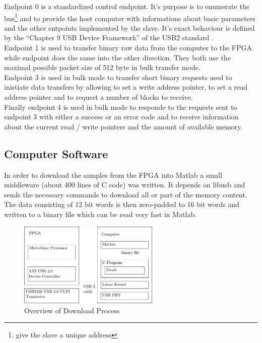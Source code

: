 Endpoint 0 is a standardized control endpoint. It's purpose is to
enumerate the bus\footnote{give the slave a unique address} and to provide the
host computer with informations about basic parameters and the other entpoints
implemented by the slave. It's exact behaviour is defined by the
``Chapter 9 USB Device Framework'' of the \gls{USB}2 standard . \\

Endpoint 1 is used to transfer binary raw data from the computer to the \gls{FPGA}
while endpoint does the same into the other direction. They both use the maximal
possible packet size of 512 byte in bulk transfer mode. \\

Endpoint 3 is used in bulk mode to transfer short binary requests used to
inistiate data transfers by allowing to set a write address pointer,
to set a read address pointer and to request a number of blocks to receive. \\

Finally endpoint 4 is used in bulk mode to responde to the requests sent
to endpoint 3 with either a success or an error code and to receive information
about the current read / write pointers and the amount of available memory. \\

\subsection{Computer Software}
In order to download the samples from the \gls{FPGA} into Matlab a small
middleware (about 400 lines of C code) was written.
It depends on libusb  and sends the necessary commands
to download all or part of the memory content.
The data consisting of 12 bit words is then zero-padded to 16 bit words
and written to a binary file which can be read very fast in Matlab. \\

\begin{figure}[ht]
  \centering
  \includegraphics[width=0.6\textwidth]{figures/fpga_download}
  \caption{Overview of Download Process}
  \label{fig:fpga_download}
\end{figure}

